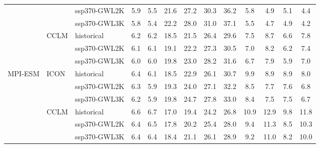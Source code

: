 \begin{table}[!htbp]
{\begin{tabular}{lll|cc|cc|cc|cc|cc}
 &  & ssp370-GWL2K & 5.9 & 5.5 & 21.6 & 27.2 & 30.3 & 36.2 & 5.8 & 4.9 & 5.1 & 4.4 \\
 &  & ssp370-GWL3K & 5.8 & 5.4 & 22.2 & 28.0 & 31.0 & 37.1 & 5.5 & 4.7 & 4.9 & 4.2 \\
\cmidrule{2-13}
 & \multirow{3}{*}{CCLM} & historical & 6.2 & 6.2 & 18.5 & 21.5 & 26.4 & 29.6 & 7.5 & 8.7 & 6.6 & 7.8 \\
 &  & ssp370-GWL2K & 6.1 & 6.1 & 19.1 & 22.2 & 27.3 & 30.5 & 7.0 & 8.2 & 6.2 & 7.4 \\
 &  & ssp370-GWL3K & 6.0 & 6.0 & 19.8 & 23.0 & 28.2 & 31.6 & 6.7 & 7.9 & 5.9 & 7.0 \\
\midrule
\multirow{6}{*}{MPI-ESM} & \multirow{3}{*}{ICON} & historical & 6.4 & 6.1 & 18.5 & 22.9 & 26.1 & 30.7 & 9.9 & 8.9 & 8.9 & 8.0 \\
 &  & ssp370-GWL2K & 6.3 & 5.9 & 19.3 & 24.0 & 27.1 & 32.2 & 8.5 & 7.7 & 7.6 & 6.8 \\
 &  & ssp370-GWL3K & 6.2 & 5.9 & 19.8 & 24.7 & 27.8 & 33.0 & 8.4 & 7.5 & 7.5 & 6.7 \\
\cmidrule{2-13}
 & \multirow{3}{*}{CCLM} & historical & 6.6 & 6.7 & 17.0 & 19.4 & 24.2 & 26.8 & 10.9 & 12.9 & 9.8 & 11.8 \\
 &  & ssp370-GWL2K & 6.4 & 6.5 & 17.8 & 20.2 & 25.4 & 28.0 & 9.4 & 11.3 & 8.5 & 10.3 \\
 &  & ssp370-GWL3K & 6.4 & 6.4 & 18.4 & 21.1 & 26.1 & 28.9 & 9.2 & 11.0 & 8.2 & 10.0 \\
\bottomrule
\end{tabular}
}
\end{table}
